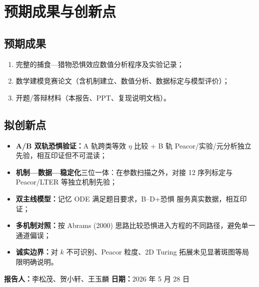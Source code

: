 \documentclass[12pt,a4paper]{ctexart}
\begin{document}
\section{预期成果与创新点}

\subsection{预期成果}

\begin{enumerate}[label=\arabic*.]
  \item 完整的捕食—猎物恐惧效应数值分析程序及实验记录；
  \item 数学建模竞赛论文（含机制建立、数值分析、数据标定与模型评价）；
  \item 开题/答辩材料（本报告、PPT、复现说明文档）。
\end{enumerate}

\subsection{拟创新点}

\begin{itemize}[leftmargin=2em]
  \item \textbf{A/B 双轨恐惧验证：}A 轨跨类等效 $\eta$ 比较 + B 轨 Peacor/实验/元分析独立先验，相互印证但不可混读；
  \item \textbf{机制—数据—稳定化}三位一体：在参数扫描之外，对接 12 序列标定与 Peacor/LTER 等独立机制先验；
  \item \textbf{双主线模型：}记忆 ODE 满足题目要求，B--D+恐惧 服务真实数据，相互印证；
  \item \textbf{多机制对照：}按 Abrams (2000) 思路比较恐惧进入方程的不同路径，避免单一通道偏误；
  \item \textbf{诚实边界：}对 $k$ 不可识别、Peacor 粒度、2D Turing 拓展未见显著斑图等局限明确说明。
\end{itemize}

\vspace{1em}
\noindent
\textbf{报告人：}李松茂、贺小轩、王玉麟 \hfill \textbf{日期：}2026 年 5 月 28 日
\end{document}

